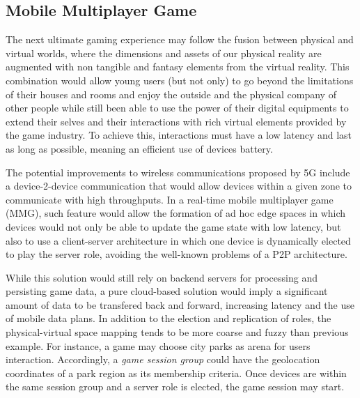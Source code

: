 
\subsection{Mobile Multiplayer Game}

The next ultimate gaming experience may follow the fusion between physical and virtual worlds, where the dimensions and assets of our physical reality are augmented with non tangible and fantasy elements from the virtual reality. This combination would allow young users (but not only) to go beyond the limitations of their houses and rooms and enjoy the outside and the physical company of other people while still been able to use the power of their digital equipments to extend their selves and their interactions with rich virtual elements provided by the game industry. To achieve this, interactions must have a low latency and last as long as possible, meaning an efficient use of devices battery. 

The potential improvements to wireless communications proposed by 5G include a device-2-device communication that would allow devices within a given zone to communicate with high throughputs. In a real-time mobile multiplayer game (MMG), such feature would allow the formation of ad hoc edge spaces in which devices would not only be able to update the game state with low latency, but also to use a client-server architecture in which one device is dynamically elected to play the server role, avoiding the well-known problems of a P2P architecture. 

While this solution would still rely on backend servers for processing and persisting game data, a pure cloud-based solution would imply a significant amount of data to be transfered back and forward, increasing latency and the use of mobile data plans. In addition to the election and replication of roles, the physical-virtual space mapping tends to be more coarse and fuzzy than previous example. For instance, a game may choose city parks as arena for users interaction. Accordingly, a \textit{game session group} could have the geolocation coordinates of a park region as its membership criteria. Once devices are within the same session group and a server role is elected, the game session may start.



